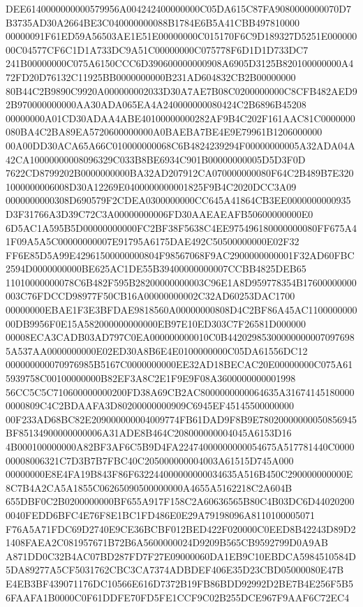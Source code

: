\documentclass[UTF8,fontset=fandol,zihao=-4,a4paper]{ctexart}
\begin{document}
{{DEE6140000000000579956A004242400000000C05DA615C87FA9080000000070D7B3735AD30A2664BE3C040000000088B1784E6B5A41CBB497810000
00000091F61ED59A56503AE1E51E00000000C015170F6C9D189327D5251E00000000C04577CF6C1D1A733DC9A51C00000000C075778F6D1D1D733DC7
241B00000000C075A6150CCC6D390600000000908A6905D3125B820100000000A472FD20D76132C11925BB0000000000B231AD604832CB2B00000000
80B44C2B9890C9920A000000002033D30A7AE7B08C0200000000C8CFB482AED92B970000000000AA30ADA065EA4A240000000080424C2B6896B45208
00000000A01CD30ADAA4ABE40100000000282AF9B4C202F161AAC81C0000000080BA4C2BA89EA5720600000000A0BAEBA7BE4E9E79961B1206000000
00A00DD30ACA65A66C010000000068C6B4824239294F00000000005A32ADA04A42CA10000000008096329C033B8BE6934C901B00000000005D5D3F0D
7622CD8799202B0000000000BA32AD207912CA070000000080F64C2B489B7E3201000000006008D30A12269E0400000000001825F9B4C2020DCC3A09
0000000000308D690579F2CDEA0300000000CC645A41864CB3EE0000000000935D3F31766A3D39C72C3A00000000006FD30AAEAEAFB50600000000E0
6D5AC1A595B5D00000000000FC2BF38F5638C4EE975496180000000080FF675A41F09A5A5C00000000007E91795A6175DAE492C50500000000E02F32
FF6E85D5A99E42961500000000804F98567068F9AC2900000000001F32AD60FBC2594D0000000000BE625AC1DE55B39400000000007CCBB4825DEB65
11010000000078C6B482F595B28200000000003C96E1A8D959778354B17600000000003C76FDCCD98977F50CB16A00000000002C32AD60253DAC1700
00000000EBAE1F3E3BFDAE9818560A00000000808D4C2BF86A45AC110000000000DB9956F0E15A582000000000000EB97E10ED303C7F26581D000000
00008ECA3CADB03AD797C0EA000000000010C0B442029853000000000070976985A537AA0000000000E02ED30A8B6E4E0100000000C05DA61556DC12
000000000070976985B5167C0000000000EE32AD18BECAC20E00000000C075A615939758C00100000000B82EF3A8C2E1F9E9F08A3600000000001998
56CC5C5C710600000000200FD38A69CB2AC8000000000064635A316741451800000000809C4C2BDAAFA3D80200000000909C6945EF45145500000000
00F233AD68BC82E209000000004009774FB61DAD9F8B9E78020000000050856945BF85134900000000006A31ADE8B464C208000000004045A6153D16
4B000100000000A82BF3AF6C5B9D4FA22474000000000054675A517781440C000000008006321C7D3B7B7FBC40C205000000004003A61515D745A000
00000000E8E4FA19B843F86F632244000000000034635A516B450C290000000000E8C7B4A2CA5A1855C06265090500000000A4655A5162218C2A604B
655DBF0C2B0200000000BF655A917F158C2A60636565B80C4B03DC6D440202000040FEDD6BFC4E76F8E1BC1FD486E0E29A79198096A8110100005071
F76A5A71FDC69D2740E9CE36BCBF012BED422F020000C0EED8B42243D89D21408FAEA2C081957671B72B6A5600000024D9209B565CB9592799D0A9AB
A871DD0C32B4AC07BD287FD7F27E09000060DA1EB9C10EBDCA5984510584D5DA89277A5CF5031762CBC3CA7374ADBDEF406E35D23CBD05000080E47B
E4EB3BF439071176DC10566E616D7372B19FB86BDD92992D2BE7B4E256F5B56FAAFA1B0000C0F61DDFE70FD5FE1CCF9C02B255DCE967F9AAF6C72EC4
}}
\end{document}
